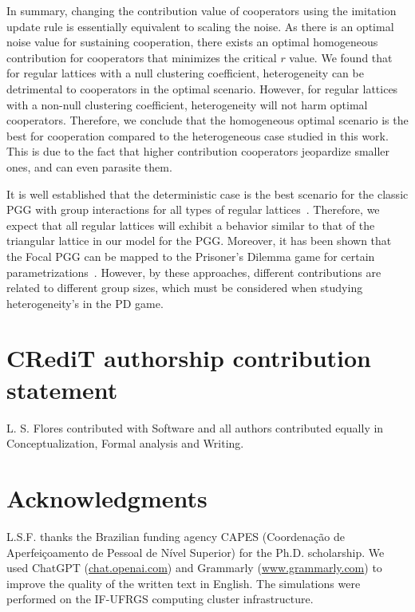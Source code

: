\documentclass[twocolumn,aps,amsmath,pre,floatfix,superscriptaddress]{revtex4-2}
\begin{document}
In summary, changing the contribution value of cooperators using the imitation update rule is essentially equivalent to scaling the noise. As there is an optimal noise value for sustaining cooperation, there exists an optimal homogeneous contribution for cooperators that minimizes the critical $r$ value.
%
We found that for regular lattices with a null clustering coefficient, heterogeneity can be detrimental to cooperators in the optimal scenario. 
%
However, for regular lattices with a non-null clustering coefficient, heterogeneity will not harm optimal cooperators. Therefore, we conclude that the homogeneous optimal scenario is the best for cooperation compared to the heterogeneous case  studied in this work.
%
This is due to the fact that higher contribution cooperators jeopardize smaller ones, and can even parasite them.
%


It is well established that the deterministic case is the best scenario for the classic PGG with group interactions for all types of regular 
lattices~\cite{perc2013evolutionary}. Therefore, we expect that all regular lattices will exhibit a behavior similar to that of the triangular lattice in our model for the PGG.
%
Moreover, it has been shown that the Focal PGG can be mapped to the Prisoner's Dilemma game for certain parametrizations~\cite{FLORES2022112744, hauert2003prisoner}. However, by these approaches, different contributions are related to different group sizes, which must be considered when studying heterogeneity's in the PD game.






\section*{CRediT authorship contribution statement}

L. S. Flores contributed with Software and all authors contributed equally in Conceptualization,
Formal analysis and Writing.
 \section*{Acknowledgments}
L.S.F. thanks the Brazilian funding agency CAPES (Coordenação de Aperfeiçoamento de Pessoal de Nível Superior) for the Ph.D. scholarship. We used ChatGPT (\url{chat.openai.com}) and Grammarly (\url{www.grammarly.com}) to improve the quality of the written text in English. The simulations were performed on the IF-UFRGS computing cluster infrastructure.
\end{document}
